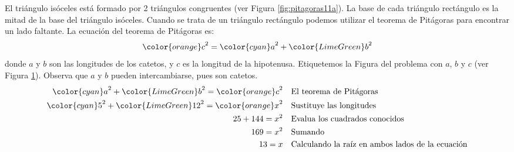 \begin{solutionbox}{14cm}
\begin{minipage}{0.35\textwidth}
\begin{figure}[H]
            \caption{}
            \label{fig:pitagoras11b}
        \end{figure}
    \end{minipage}\hfill
    \begin{minipage}{0.6\textwidth}
        El triángulo isóceles está formado por 2 triángulos congruentes (ver Figura \ref{fig:pitagoras11a}).
        La base de cada triángulo rectángulo es la mitad de la base del triángulo isóceles.
        Cuando se trata de un triángulo rectángulo podemos utilizar el teorema de Pitágoras para encontrar un lado faltante.
        La ecuación del teorema de Pitágoras es:
        \[{\color{orange}c}^2={\color{cyan}a}^2+{\color{LimeGreen}b}^2\]
        donde $a$ y $b$ son las longitudes de los catetos, y $c$ es la longitud de la hipotenusa.
        Etiquetemos la Figura del problema con $a$, $b$ y $c$ (ver Figura \ref{fig:pitagoras11b}).
        Observa que $a$ y $b$ pueden intercambiarse, pues son catetos.
        \begin{align*}
            {\color{cyan}a}^2+{\color{LimeGreen}b}^2  ={\color{orange}c}^2  & \text{\quad El teorema de Pitágoras}                          \\
            {\color{cyan}5}^2+{\color{LimeGreen}12}^2  ={\color{orange}x}^2 & \text{\quad Sustituye las longitudes}                         \\
            25+144  =x^2                                                    & \text{\quad Evalua los cuadrados conocidos}                   \\
            169=x^2                                                         & \text{\quad Sumando }                                         \\
            13=x                                                            & \text{\quad Calculando la raíz en ambos lados de la ecuación} \\
        \end{align*}
    \end{minipage}
\end{solutionbox}
